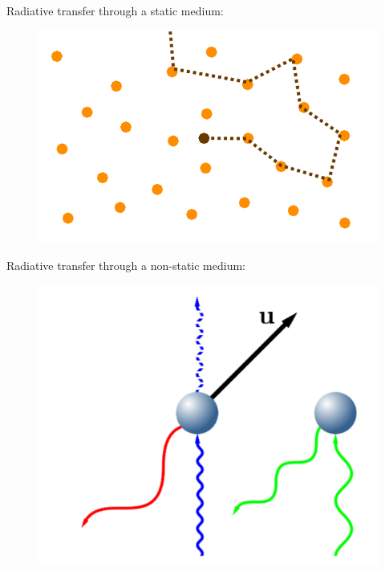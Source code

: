\documentclass{beamer}
\begin{document}
\begin{frame}{Radiative transfer through a static medium:}
\begin{figure}
\includegraphics[scale=0.4]{Figures/RT.png}
\end{figure}
\end{frame}

\begin{frame}{Radiative transfer through a non-static medium:}
\begin{figure}
\includegraphics[scale=0.4]{Figures/xshift.png}
\end{figure}
\end{frame}
\end{document}
